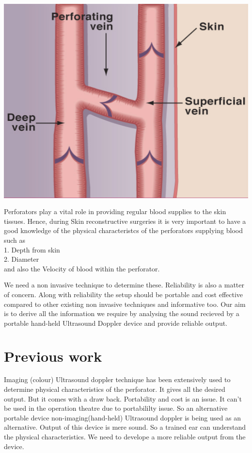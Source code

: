 \documentclass[BTech]{nitkdiss}
\begin{document}
\begin{center}
\includegraphics[scale = 0.40]{perforator.png}
\end{center}




\hspace{0.4cm} Perforators play a vital role in providing regular blood supplies to the skin tissues. Hence, during Skin reconstructive surgeries it is very important to have a good knowledge of the physical characteristcs of the perforators supplying blood such as \\
1. Depth from skin\\
2. Diameter\\
and also the Velocity of blood within the perforator.

We need a non invasive technique to determine these. Reliability is also a matter of concern. Along with reliability the setup should be portable and cost effective compared to other existing non invasive techniques and informative too. Our aim is to derive all the information we require by analysing the sound recieved by a portable hand-held Ultrasound Doppler device and provide reliable output.



\section{Previous work}
\hspace{0.4cm} Imaging (colour) Ultrasound doppler technique has been extensively used to determine physical characteristics of the perforator. It gives all the desired output. But it comes with a draw back. Portability and cost is an issue. It can't be used in the operation theatre due to portabililty issue. So an alternative portable device non-imaging(hand-held) Ultrasound doppler is being used as an alternative. Output of this device is mere sound. So a trained ear can understand the physical characteristics. We need to develope a more reliable output from the device.
\end{document}
